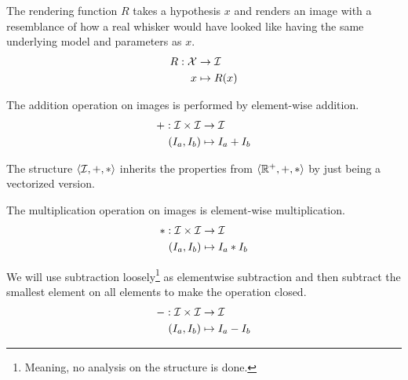 \begin{definition}
 \label{def:hypothesis_render}
  The rendering function $R$ takes a hypothesis $x$ and renders an
  image with a resemblance of how a real whisker would have looked
  like having the same underlying model and parameters as $x$.
  \begin{equation}
    \begin{split}
      R : \mathcal{X} &\rightarrow \mathcal{I}\\
      x &\mapsto R(x)
    \end{split}
  \end{equation}
\end{definition}

\begin{definition}
 \label{def:image_addition}
  The addition operation on images is performed by element-wise
  addition.
  \begin{equation}
    \begin{split}
      + : \mathcal{I} \times \mathcal{I} &\rightarrow \mathcal{I}\\
      (I_a,I_b) &\mapsto I_a+I_b
    \end{split}
  \end{equation}

  The structure $\langle \mathcal{I},+,*\rangle$ inherits the properties from
  $\langle \mathbb{R}^+,+,*\rangle$ by just being a vectorized version.
\end{definition}

\begin{definition}
 \label{def:image_multiplication}
  The multiplication operation on images is element-wise
  multiplication.
  \begin{equation}
    \begin{split}
      * : \mathcal{I} \times \mathcal{I} &\rightarrow \mathcal{I}\\
      (I_a,I_b) &\mapsto I_a*I_b
    \end{split}
  \end{equation}
\end{definition}

\begin{definition}
\label{def:image_subtraction}
  We will use subtraction loosely\footnote{Meaning, no analysis on the
    structure is done.} as elementwise subtraction and then subtract
  the smallest element on all elements to make the operation closed.
  \begin{equation}
    \begin{split}
      - : \mathcal{I} \times \mathcal{I} &\rightarrow \mathcal{I}\\
      (I_a,I_b) &\mapsto I_a-I_b
    \end{split}
  \end{equation}
\end{definition}

